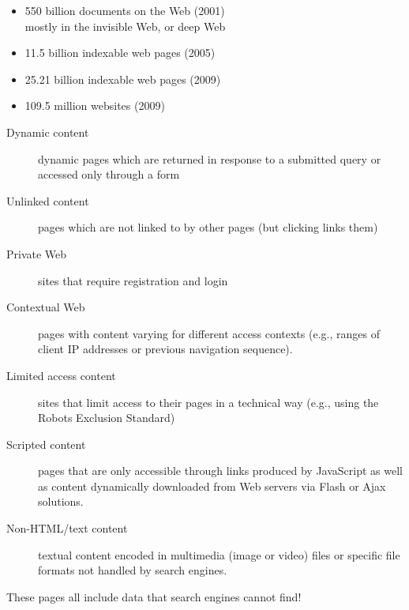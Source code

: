 \documentclass[a4paper,landscape,headrule,footrule,xetex]{foils}
\begin{document}
\begin{itemize}
\item 550 billion documents on the Web (2001)
  \\ mostly in the invisible Web, or deep Web
\item 11.5 billion indexable web pages (2005)
\item 25.21 billion indexable web pages (2009)
\item 109.5 million websites (2009)
\end{itemize}

\begin{description}
\item [Dynamic content] dynamic pages which are returned in response to a submitted query or accessed only through a form
\item [Unlinked content] pages which are not linked to by other pages (but clicking links them)
\item [Private Web] sites that require registration and login
\item [Contextual Web] pages with content varying for different access contexts (e.g., ranges of client IP addresses or previous navigation sequence).
\item [Limited access content] sites that limit access to their pages
  in a technical way (e.g., using the Robots Exclusion Standard)
\item [Scripted content] pages that are only accessible through links produced by JavaScript as well as content dynamically downloaded from Web servers via Flash or Ajax solutions.
\item [Non-HTML/text content] textual content encoded in multimedia (image or video) files or specific file formats not handled by search engines.
\end{description}

These pages all include data that search engines cannot find!
\end{document}
